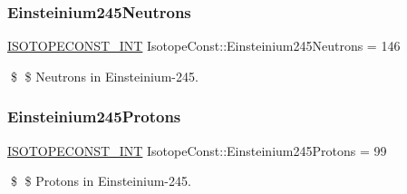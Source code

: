 \subsubsection{\texorpdfstring{Einsteinium245\+Neutrons}{Einsteinium245Neutrons}}
{\footnotesize\ttfamily \mbox{\hyperlink{group___isotope_const-_macros_ga5f18360b3e99483a35c32d789e62621c}{I\+S\+O\+T\+O\+P\+E\+C\+O\+N\+S\+T\+\_\+\+I\+NT}} Isotope\+Const\+::\+Einsteinium245\+Neutrons = 146}

\$ \$ Neutrons in Einsteinium-\/245. \mbox{\label{group___isotope_const-_einsteinium-_es245_ga34cbb7b595abc67af74f50b395d252c6}} 
\subsubsection{\texorpdfstring{Einsteinium245\+Protons}{Einsteinium245Protons}}
{\footnotesize\ttfamily \mbox{\hyperlink{group___isotope_const-_macros_ga5f18360b3e99483a35c32d789e62621c}{I\+S\+O\+T\+O\+P\+E\+C\+O\+N\+S\+T\+\_\+\+I\+NT}} Isotope\+Const\+::\+Einsteinium245\+Protons = 99}

\$ \$ Protons in Einsteinium-\/245. 